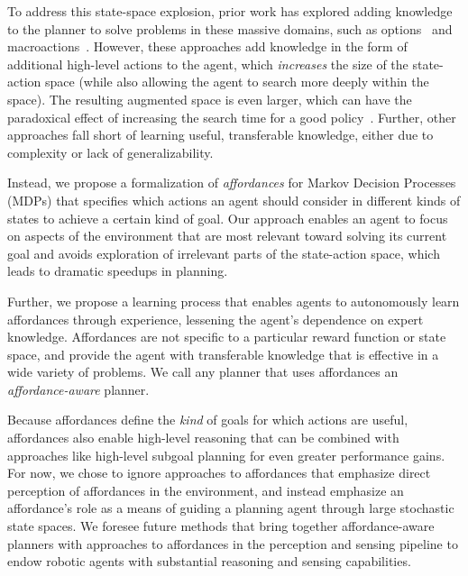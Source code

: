 \documentclass[conference]{IEEEtran}
\begin{document}
To address this state-space explosion, prior work has explored adding
knowledge to the planner to solve problems in these
massive domains, such as options~\citep{sutton99} and
macroactions~\citep{Botea:2005kx,Newton:2005vn}. However, these
approaches add knowledge in the form of additional high-level actions
to the agent, which {\em increases} the size of the state-action space
(while also allowing the agent to search more deeply within the
space).  The resulting augmented space is even larger, which can have
the paradoxical effect of increasing the search time for a good
policy~\citep{Jong:2008zr}. Further, other approaches fall short of learning useful, transferable knowledge,
either due to complexity or lack of generalizability.

Instead, we propose a formalization of {\em affordances} \citep{gibson77} for Markov Decision Processes (MDPs) that
specifies which actions an agent should consider in different kinds of states to achieve a certain kind of goal.
Our approach enables an agent to focus on
aspects of the environment that are most relevant toward solving its current goal 
and avoids exploration of irrelevant parts of the 
state-action space, which leads to dramatic speedups in planning.

Further, we propose a learning process that
enables agents to autonomously learn affordances through experience, lessening
the agent's dependence on expert knowledge. Affordances are not specific to a particular reward 
function or state space, and provide the agent with transferable 
knowledge that is effective in a wide variety of problems. We call any planner that
uses affordances an {\it affordance-aware} planner.

Because affordances define the {\em kind} of goals for which actions are useful,
affordances also enable high-level reasoning that can
be combined with approaches like high-level subgoal planning for even
greater performance gains. For now, we chose to ignore approaches to affordances that emphasize
direct perception of affordances in the environment, and instead emphasize an
affordance's role as a means of guiding a planning agent through large stochastic state spaces. We foresee
future methods that bring together affordance-aware planners with approaches to affordances
in the perception and sensing pipeline to endow robotic agents with substantial reasoning and sensing capabilities.

\end{document}
